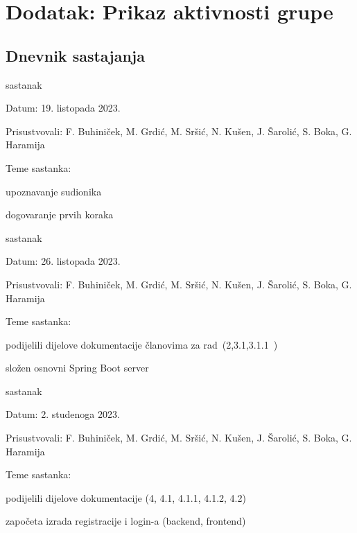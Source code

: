 \chapter*{Dodatak: Prikaz aktivnosti grupe}
		
		\section*{Dnevnik sastajanja}
		
		
		\begin{packed_enum}
			\item  sastanak
			
			\item[] \begin{packed_item}
				\item Datum: 19. listopada 2023.
				\item Prisustvovali: F. Buhiniček, M. Grdić, M. Sršić, N. Kušen, J. Šarolić, S. Boka, G. Haramija
				\item Teme sastanka:
				\begin{packed_item}
					\item  upoznavanje sudionika 
					\item  dogovaranje prvih koraka
				\end{packed_item}
			\end{packed_item}
			
			\item  sastanak
			\item[] \begin{packed_item}
				\item Datum: 26. listopada 2023.
				\item Prisustvovali: F. Buhiniček, M. Grdić, M. Sršić, N. Kušen, J. Šarolić, S. Boka, G. Haramija
				\item Teme sastanka:
				\begin{packed_item}
					\item  podijelili dijelove dokumentacije članovima za rad (2,3.1,3.1.1 )
					\item  složen osnovni Spring Boot server
				\end{packed_item}
			\end{packed_item}
			
						\item  sastanak
			\item[] \begin{packed_item}
				\item Datum:  2. studenoga 2023.
				\item Prisustvovali: F. Buhiniček, M. Grdić, M. Sršić, N. Kušen, J. Šarolić, S. Boka, G. Haramija
				\item Teme sastanka:
				\begin{packed_item}
					\item  podijelili dijelove dokumentacije (4, 4.1, 4.1.1, 4.1.2, 4.2)
					\item  započeta izrada registracije i login-a (backend, frontend)
				\end{packed_item}
			\end{packed_item}
			

\end{packed_enum}
